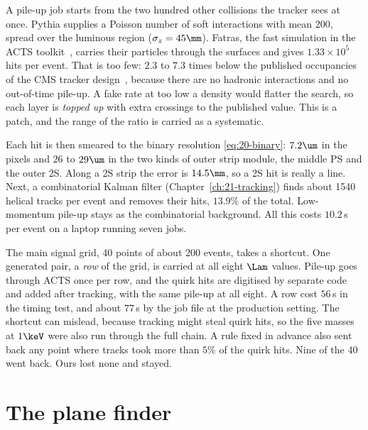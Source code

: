 A pile-up job starts from the two hundred other collisions the tracker sees at once. Pythia supplies a Poisson number of soft
interactions with mean 200, spread over the luminous region ($\sigma_z=45\mm$). Fatras, the fast simulation in the ACTS
toolkit~\cite{Ai:2021ghi}, carries their particles through the surfaces and gives $1.33\times10^5$ hits per event. That
is too few: $2.3$ to $7.3$ times below the published occupancies of the CMS tracker design~\cite{CMS:2017lum}, because
there are no hadronic interactions and no out-of-time pile-up. A fake rate at too low a density would flatter the search, so each layer
is \emph{topped up} with extra crossings to the published value. This is a patch, and the
range of the ratio is carried as a systematic.

Each hit is then smeared to the binary resolution \eqref{eq:20-binary}: $7.2\um$ in the pixels and $26$ to
$29\um$ in the two kinds of outer strip module, the middle PS and the outer 2S. Along a 2S strip the error is $14.5\mm$, so a 2S hit is really a line.
Next, a combinatorial Kalman filter (Chapter~\ref{ch:21-tracking}) finds about 1540 helical tracks per event and removes their
hits, $13.9\%$ of the total. Low-momentum pile-up stays as the combinatorial background. All this costs
$10.2$\,s per event on a laptop running seven jobs.

The main signal grid, 40 points of about 200 events, takes a shortcut. One generated pair, a \emph{row} of the grid, is carried at all eight $\Lam$ values. Pile-up goes through ACTS once per row, and
the quirk hits are digitised by separate code and added after tracking, with the same pile-up at all eight.
A row cost $56$\,s in the timing test, and about $77$\,s by the job file at the production setting. The shortcut can mislead, because tracking might steal quirk hits, so the five
masses at $1\keV$ were also run through the full chain. A rule fixed in advance also sent back any point where tracks took more than $5\%$ of the
quirk hits. Nine of the 40 went back. Ours lost none and stayed.

\section{The plane finder}\label{sec:25-finder}

